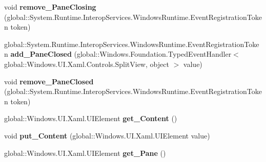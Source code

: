 \begin{DoxyCompactItemize}
\item 
\mbox{\label{interface_windows_1_1_u_i_1_1_xaml_1_1_controls_1_1_i_split_view_a6264ad76174d999d605b9e7745a813f6}} 
void {\bfseries remove\+\_\+\+Pane\+Closing} (global\+::\+System.\+Runtime.\+Interop\+Services.\+Windows\+Runtime.\+Event\+Registration\+Token token)
\item 
\mbox{\label{interface_windows_1_1_u_i_1_1_xaml_1_1_controls_1_1_i_split_view_a5a3d86d9589e5de24342d96eaf2c1c61}} 
global\+::\+System.\+Runtime.\+Interop\+Services.\+Windows\+Runtime.\+Event\+Registration\+Token {\bfseries add\+\_\+\+Pane\+Closed} (global\+::\+Windows.\+Foundation.\+Typed\+Event\+Handler$<$ global\+::\+Windows.\+U\+I.\+Xaml.\+Controls.\+Split\+View, object $>$ value)
\item 
\mbox{\label{interface_windows_1_1_u_i_1_1_xaml_1_1_controls_1_1_i_split_view_a6450b9b0d59bee0c4df61f67cba5609e}} 
void {\bfseries remove\+\_\+\+Pane\+Closed} (global\+::\+System.\+Runtime.\+Interop\+Services.\+Windows\+Runtime.\+Event\+Registration\+Token token)
\item 
\mbox{\label{interface_windows_1_1_u_i_1_1_xaml_1_1_controls_1_1_i_split_view_ab894c1ae83bd61f588e1be844b3d9a6f}} 
global\+::\+Windows.\+U\+I.\+Xaml.\+U\+I\+Element {\bfseries get\+\_\+\+Content} ()
\item 
\mbox{\label{interface_windows_1_1_u_i_1_1_xaml_1_1_controls_1_1_i_split_view_a49750de7e2ee3bd1224af98270b5d354}} 
void {\bfseries put\+\_\+\+Content} (global\+::\+Windows.\+U\+I.\+Xaml.\+U\+I\+Element value)
\item 
\mbox{\label{interface_windows_1_1_u_i_1_1_xaml_1_1_controls_1_1_i_split_view_a20373a0e78a10fa6edcfbbb5fc28876f}} 
global\+::\+Windows.\+U\+I.\+Xaml.\+U\+I\+Element {\bfseries get\+\_\+\+Pane} ()
\item 
\mbox{\label{interface_windows_1_1_u_i_1_1_xaml_1_1_controls_1_1_i_split_view_ae154773362c08fdd390cae063a4a432d}} 

\end{DoxyCompactItemize}
